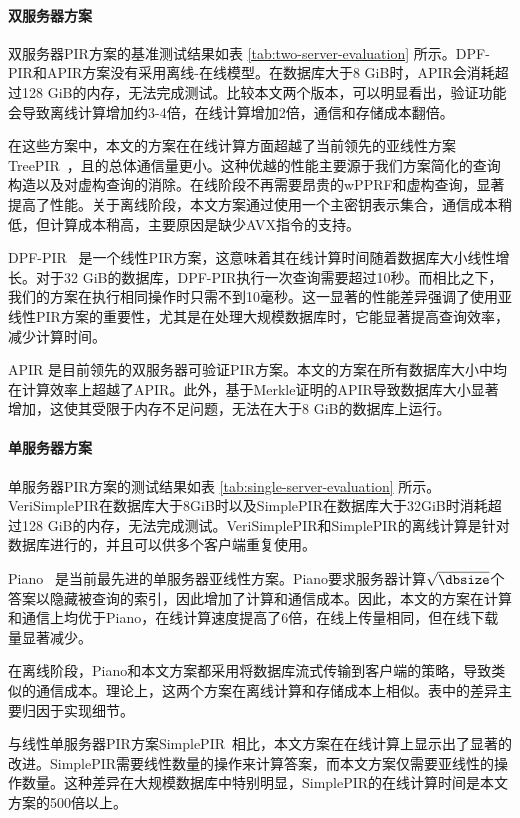 \paragraph{双服务器方案}
双服务器PIR方案的基准测试结果如表 \ref{tab:two-server-evaluation} 所示。DPF-PIR和APIR方案没有采用离线-在线模型。在数据库大于8 GiB时，APIR会消耗超过128 GiB的内存，无法完成测试。比较本文两个版本，可以明显看出，验证功能会导致离线计算增加约3-4倍，在线计算增加2倍，通信和存储成本翻倍。

在这些方案中，本文的方案在在线计算方面超越了当前领先的亚线性方案TreePIR~\cite{C:LazPap23}，且的总体通信量更小。这种优越的性能主要源于我们方案简化的查询构造以及对虚构查询的消除。在线阶段不再需要昂贵的wPPRF和虚构查询，显著提高了性能。关于离线阶段，本文方案通过使用一个主密钥表示集合，通信成本稍低，但计算成本稍高，主要原因是缺少AVX指令的支持。

DPF-PIR~\cite{EC:GilIsh14} 是一个线性PIR方案，这意味着其在线计算时间随着数据库大小线性增长。对于32 GiB的数据库，DPF-PIR执行一次查询需要超过10秒。而相比之下，我们的方案在执行相同操作时只需不到10毫秒。这一显著的性能差异强调了使用亚线性PIR方案的重要性，尤其是在处理大规模数据库时，它能显著提高查询效率，减少计算时间。

APIR \cite{APIR} 是目前领先的双服务器可验证PIR方案。本文的方案在所有数据库大小中均在计算效率上超越了APIR。此外，基于Merkle证明的APIR导致数据库大小显著增加，这使其受限于内存不足问题，无法在大于8 GiB的数据库上运行。

\paragraph{单服务器方案}
单服务器PIR方案的测试结果如表 \ref{tab:single-server-evaluation} 所示。VeriSimplePIR在数据库大于8GiB时以及SimplePIR在数据库大于32GiB时消耗超过128 GiB的内存，无法完成测试。VeriSimplePIR和SimplePIR的离线计算是针对数据库进行的，并且可以供多个客户端重复使用。

Piano~\cite{Piano} 是当前最先进的单服务器亚线性方案。Piano要求服务器计算$\sqrt{\dbsize}$个答案以隐藏被查询的索引，因此增加了计算和通信成本。因此，本文的方案在计算和通信上均优于Piano，在线计算速度提高了6倍，在线上传量相同，但在线下载量显著减少。

在离线阶段，Piano和本文方案都采用将数据库流式传输到客户端的策略，导致类似的通信成本。理论上，这两个方案在离线计算和存储成本上相似。表中的差异主要归因于实现细节。

与线性单服务器PIR方案SimplePIR~\cite{SimplePIR}相比，本文方案在在线计算上显示出了显著的改进。SimplePIR需要线性数量的操作来计算答案，而本文方案仅需要亚线性的操作数量。这种差异在大规模数据库中特别明显，SimplePIR的在线计算时间是本文方案的500倍以上。

